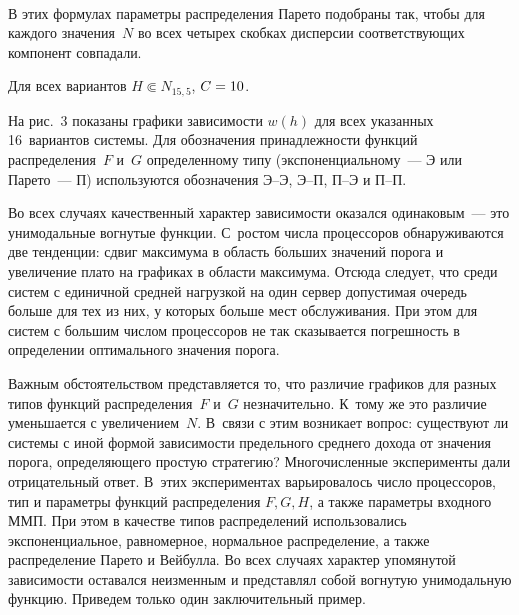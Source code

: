 \begin{multicols}{2}
    \begin{figure*} %
     \vspace*{1pt}
 \begin{center}
 \mbox{%
 \epsfxsize=124.313mm
 }
 \end{center}
 \vspace*{-6pt}
   \end{figure*}
   
\noindent
В этих формулах параметры распределения Парето подобраны так, чтобы для каждого 
значения~$N$  во всех четырех скобках дисперсии соответствующих компонент 
совпадали.


  Для всех вариантов $H\Subset N_{15{,}5}$, $C\hm=10$.
  
  На рис.~3  показаны графики зависимости $w(h)$ для всех указанных 16~вариантов 
системы. Для обозначения принадлежности функций распределения~$F$ и~$G$ 
определенному типу (экспоненциальному~--- Э или Парето~--- П) используются 
обозначения Э--Э, Э--П, П--Э и П--П.
  

   
  Во всех случаях качественный характер зависимости оказался одинаковым~--- это 
унимодальные вогнутые функции. С~ростом числа процессоров обнаруживаются две 
тенденции: сдвиг максимума в область б$\acute{\mbox{о}}$льших значений порога и 
увеличение плато на графиках в области максимума. Отсюда следует, что среди систем с 
единичной средней нагрузкой на один сервер допустимая очередь больше для тех из них, 
у которых больше мест обслуживания. При этом для систем с большим числом 
процессоров не так сказывается погрешность в определении оптимального значения 
порога.
  
  Важным обстоятельством представляется то, что различие графиков для разных типов 
функций распределения~$F$ и~$G$ незначительно. К~тому же это различие уменьшается 
с увеличением~$N$. В~связи с этим возникает вопрос: существуют ли системы с иной 
формой зависимости предельного среднего дохода от значения порога, определяющего 
прос\-тую стратегию? Многочисленные эксперименты дали отрицательный ответ. В~этих 
экспериментах варьировалось число процессоров, тип и па\-ра\-мет\-ры функций 
распределения $F,G,H$, а также па\-ра\-мет\-ры входного ММП. При этом в качестве типов 
распределений использовались экспоненциальное, равномерное, нормальное 
распределение, а также распределение Парето и Вей\-бул\-ла. Во всех случаях характер 
упомянутой зависимости оставался неизменным и представлял собой вогнутую 
унимодальную функцию. Приведем только один заключительный пример.
  

\end{multicols}
